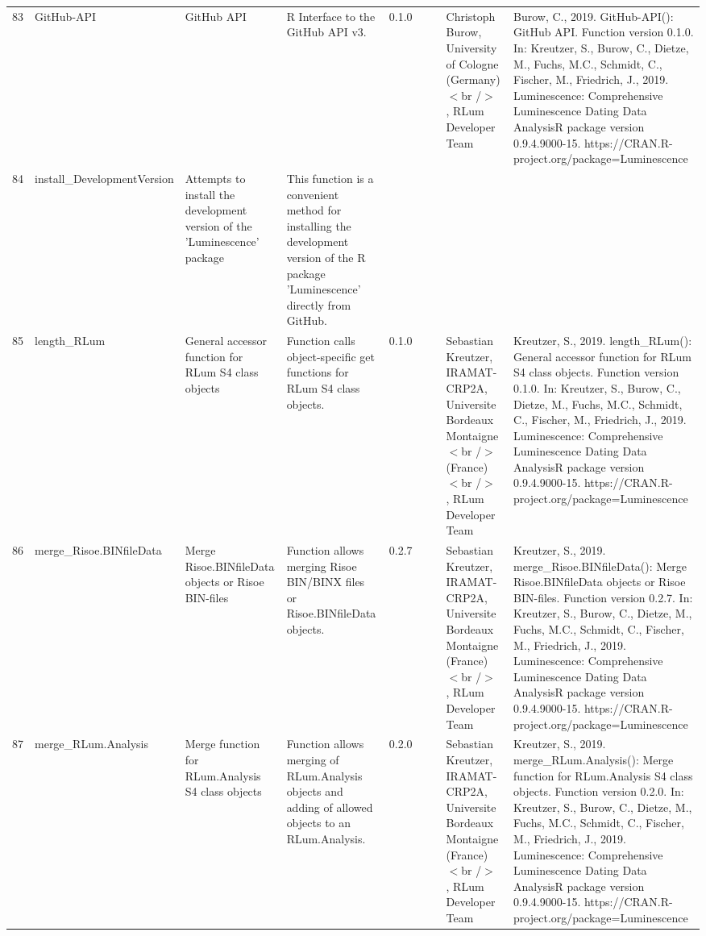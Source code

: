 \begin{table}[ht]
\begin{tabular}{rllllllll}
 \\ 
  83 & GitHub-API & GitHub API & R Interface to the GitHub API v3. & 0.1.0
 &  &  & Christoph Burow, University of Cologne (Germany)$<$br /$>$ , RLum Developer Team & Burow, C., 2019. GitHub-API(): GitHub API. Function version 0.1.0. In: Kreutzer, S., Burow, C., Dietze, M., Fuchs, M.C., Schmidt, C., Fischer, M., Friedrich, J., 2019. Luminescence: Comprehensive Luminescence Dating Data AnalysisR package version 0.9.4.9000-15. https://CRAN.R-project.org/package=Luminescence
 \\ 
  84 & install\_DevelopmentVersion & Attempts to install the development version of the 'Luminescence' package & This function is a convenient method for installing the development version of the R package 'Luminescence' directly from GitHub. &  &  &  &  &  \\ 
  85 & length\_RLum & General accessor function for RLum S4 class objects & Function calls object-specific get functions for RLum S4 class objects. & 0.1.0
 &  &  & Sebastian Kreutzer, IRAMAT-CRP2A, Universite Bordeaux Montaigne$<$br /$>$ (France)$<$br /$>$ , RLum Developer Team & Kreutzer, S., 2019. length\_RLum(): General accessor function for RLum S4 class objects. Function version 0.1.0. In: Kreutzer, S., Burow, C., Dietze, M., Fuchs, M.C., Schmidt, C., Fischer, M., Friedrich, J., 2019. Luminescence: Comprehensive Luminescence Dating Data AnalysisR package version 0.9.4.9000-15. https://CRAN.R-project.org/package=Luminescence
 \\ 
  86 & merge\_Risoe.BINfileData & Merge Risoe.BINfileData objects or Risoe BIN-files & Function allows merging Risoe BIN/BINX files or Risoe.BINfileData objects. & 0.2.7
 &  &  & Sebastian Kreutzer, IRAMAT-CRP2A, Universite Bordeaux Montaigne (France)$<$br /$>$ , RLum Developer Team & Kreutzer, S., 2019. merge\_Risoe.BINfileData(): Merge Risoe.BINfileData objects or Risoe BIN-files. Function version 0.2.7. In: Kreutzer, S., Burow, C., Dietze, M., Fuchs, M.C., Schmidt, C., Fischer, M., Friedrich, J., 2019. Luminescence: Comprehensive Luminescence Dating Data AnalysisR package version 0.9.4.9000-15. https://CRAN.R-project.org/package=Luminescence
 \\ 
  87 & merge\_RLum.Analysis & Merge function for RLum.Analysis S4 class objects & Function allows merging of RLum.Analysis objects and adding of allowed objects to an RLum.Analysis. & 0.2.0
 &  &  & Sebastian Kreutzer, IRAMAT-CRP2A, Universite Bordeaux Montaigne (France)$<$br /$>$ , RLum Developer Team & Kreutzer, S., 2019. merge\_RLum.Analysis(): Merge function for RLum.Analysis S4 class objects. Function version 0.2.0. In: Kreutzer, S., Burow, C., Dietze, M., Fuchs, M.C., Schmidt, C., Fischer, M., Friedrich, J., 2019. Luminescence: Comprehensive Luminescence Dating Data AnalysisR package version 0.9.4.9000-15. https://CRAN.R-project.org/package=Luminescence

\end{tabular}
\end{table}
